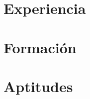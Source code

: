 \documentclass{article}[a4]
\begin{document}


\section*{Experiencia}



\section*{Formación}



\section*{Aptitudes}




% 
\end{document}
